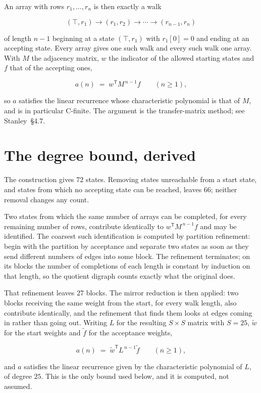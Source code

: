 \documentclass[11pt]{article}
\theoremstyle{definition}
\begin{document}
An array with rows $r_1,\dots,r_n$ is then exactly a walk

\[(\top,r_1) \to (r_1,r_2) \to \cdots \to (r_{n-1},r_n)\]

of length $n-1$ beginning at a state $(\top,r_1)$ with $r_1[0]=0$ and ending at an accepting state. Every array gives one such walk and every such walk one array. With $M$ the adjacency matrix, $w$ the indicator of the allowed starting states and $f$ that of the accepting ones,

\[a(n) \;=\; w^{\mathsf T} M^{\,n-1} f \qquad (n \ge 1),\]

so $a$ satisfies the linear recurrence whose characteristic polynomial is that of $M$, and is in particular C-finite. The argument is the transfer-matrix method; see Stanley~\S4.7.

\section{The degree bound, derived}

The construction gives $72$ states. Removing states unreachable from a start state, and states from which no accepting state can be reached, leaves $66$; neither removal changes any count.

Two states from which the same number of arrays can be completed, for every remaining number of rows, contribute identically to $w^{\mathsf T}M^{\,n-1}f$ and may be identified. The coarsest such identification is computed by partition refinement: begin with the partition by acceptance and separate two states as soon as they send different numbers of edges into some block. The refinement terminates; on its blocks the number of completions of each length is constant by induction on that length, so the quotient digraph counts exactly what the original does.

That refinement leaves $27$ blocks. The mirror reduction is then applied: two blocks receiving the same weight from the start, for every walk length, also contribute identically, and the refinement that finds them looks at edges coming in rather than going out. Writing $L$ for the resulting $S \times S$ matrix with $S = 25$, $\tilde w$ for the start weights and $\tilde f$ for the acceptance weights,

\[a(n) \;=\; \tilde w^{\mathsf T} L^{\,n-1} \tilde f \qquad (n \ge 1),\]

and $a$ satisfies the linear recurrence given by the characteristic polynomial of $L$, of degree $25$. This is the only bound used below, and it is computed, not assumed.
\end{document}
